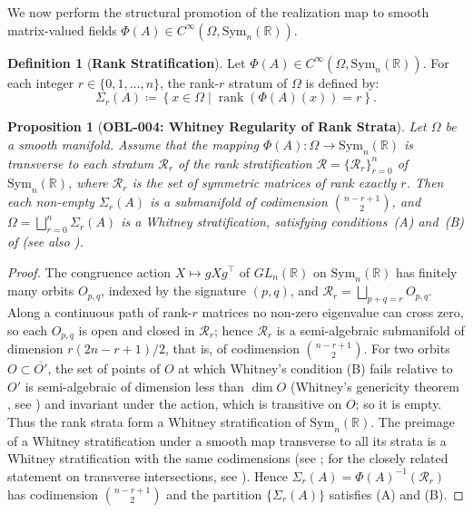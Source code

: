 \documentclass[11pt,a4paper,reqno]{amsart}
\newtheorem{proposition}[theorem]{Proposition}
\theoremstyle{definition}
\newtheorem{definition}[theorem]{Definition}
\theoremstyle{remark}
\numberwithin{equation}{section}
\begin{document}
We now perform the structural promotion of the realization map to smooth matrix-valued fields $\Phi(A) \in C^\infty(\Omega, \mathrm{Sym}_n(\mathbb{R}))$.

\begin{definition}[\textbf{Rank Stratification}]
\label{def:rank_strat}
Let $\Phi(A) \in C^\infty(\Omega, \mathrm{Sym}_n(\mathbb{R}))$. For each integer $r \in \{0, 1, \dots, n\}$, the rank-$r$ stratum of $\Omega$ is defined by:
\begin{equation}
\Sigma_r(A) \coloneqq \left\{ x \in \Omega \mid \operatorname{rank}(\Phi(A)(x)) = r \right\}.
\end{equation}
\end{definition}

\begin{proposition}[\textbf{OBL-004: Whitney Regularity of Rank Strata}]
\label{prop:whitney_rank_strat}
Let $\Omega$ be a smooth manifold. Assume that the mapping $\Phi(A) \colon \Omega \to \mathrm{Sym}_n(\mathbb{R})$ is transverse to each stratum $\mathcal{R}_r$ of the rank stratification $\mathcal{R} = \{\mathcal{R}_r\}_{r=0}^n$ of $\mathrm{Sym}_n(\mathbb{R})$, where $\mathcal{R}_r$ is the set of symmetric matrices of rank exactly $r$. Then each non-empty $\Sigma_r(A)$ is a submanifold of codimension $\binom{n-r+1}{2}$, and $\Omega = \bigsqcup_{r=0}^n \Sigma_r(A)$ is a Whitney stratification, satisfying conditions~(A) and~(B) of \cite{Whitney1965} (see also \cite[\S\S1--2]{Mather2012}).
\end{proposition}

\begin{proof}
The congruence action $X \mapsto gXg^{\top}$ of $GL_n(\mathbb{R})$ on $\mathrm{Sym}_n(\mathbb{R})$ has finitely many orbits $O_{p,q}$, indexed by the signature $(p,q)$, and $\mathcal{R}_r = \bigsqcup_{p+q=r} O_{p,q}$. Along a continuous path of rank-$r$ matrices no non-zero eigenvalue can cross zero, so each $O_{p,q}$ is open and closed in $\mathcal{R}_r$; hence $\mathcal{R}_r$ is a semi-algebraic submanifold of dimension $r(2n-r+1)/2$, that is, of codimension $\binom{n-r+1}{2}$. For two orbits $O \subset \overline{O'}$, the set of points of $O$ at which Whitney's condition (B) fails relative to $O'$ is semi-algebraic of dimension less than $\dim O$ (Whitney's genericity theorem \cite{Whitney1965}, see \cite{GibsonEtAl1976}) and invariant under the action, which is transitive on $O$; so it is empty. Thus the rank strata form a Whitney stratification of $\mathrm{Sym}_n(\mathbb{R})$. The preimage of a Whitney stratification under a smooth map transverse to all its strata is a Whitney stratification with the same codimensions (see \cite{GibsonEtAl1976}; for the closely related statement on transverse intersections, see \cite{OrroTrotman2010}). Hence $\Sigma_r(A) = \Phi(A)^{-1}(\mathcal{R}_r)$ has codimension $\binom{n-r+1}{2}$ and the partition $\{\Sigma_r(A)\}$ satisfies (A) and (B).
\end{proof}
\end{document}
